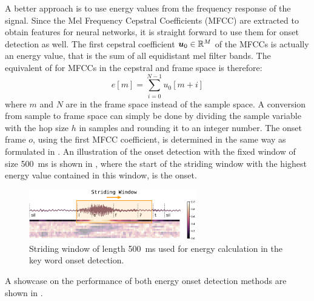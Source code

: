 A better approach is to use energy values from the frequency response of the signal.
Since the Mel Frequency Cepstral Coefficients (MFCC) are extracted to obtain features for neural networks, it is straight forward to use them for onset detection as well.
The first cepstral coefficient $\bm{u}_0 \in \mathbb{R}^M$ of the MFCCs is actually an energy value, that is the sum of all equidistant mel filter bands.
The equivalent of  for MFCCs in the cepstral and frame space is therefore:
\begin{equation}
  e[m] = \sum_{i=0}^{N-1} u_0[m + i]
\end{equation}
where $m$ and $N$ are in the frame space instead of the sample space.
A conversion from sample to frame space can simply be done by dividing the sample variable with the hop size $h$ in samples and rounding it to an integer number.
The onset frame $o$, using the first MFCC coefficient, is determined in the same way as formulated in .
An illustration of the onset detection with the fixed window of size \SI{500}{\milli\second} is shown in , where
the start of the striding window with the highest energy value contained in this window, is the onset.
\begin{figure}[!ht]
  \centering
    \includegraphics[width=0.65\textwidth]{./3_signal/figs/signal_onset_window}
  \caption{Striding window of length \SI{500}{\milli\second} used for energy calculation in the key word onset detection.}
  \label{fig:signal_onset_window}
\end{figure}
\FloatBarrier
\noindent
A showcase on the performance of both energy onset detection methods are shown in .
